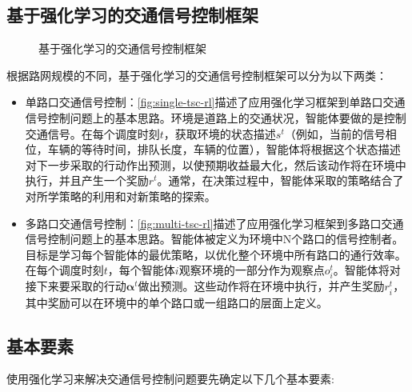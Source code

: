 \subsection{基于强化学习的交通信号控制框架}
\begin{figure}[t]
    \label{fig:TSC-RL}
    \quad
    \caption[]{基于强化学习的交通信号控制框架}
  \end{figure}
根据路网规模的不同，基于强化学习的交通信号控制框架可以分为以下两类：
\begin{itemize}
    \item 单路口交通信号控制：\autoref{fig:single-tsc-rl}描述了应用强化学习框架到单路口交通信号控制问题上的基本思路。环境是道路上的交通状况，智能体要做的是控制交通信号。在每个调度时刻$t$，获取环境的状态描述$s^t$（例如，当前的信号相位，车辆的等待时间，排队长度，车辆的位置），智能体将根据这个状态描述对下一步采取的行动作出预测，以使预期收益最大化，然后该动作将在环境中执行，并且产生一个奖励$r^t$。通常，在决策过程中，智能体采取的策略结合了对所学策略的利用和对新策略的探索。
    \item 多路口交通信号控制：\autoref{fig:multi-tsc-rl}描述了应用强化学习框架到多路口交通信号控制问题上的基本思路。智能体被定义为环境中N个路口的信号控制者。目标是学习每个智能体的最优策略，以优化整个环境中所有路口的通行效率。在每个调度时刻$t$，每个智能体$i$观察环境的一部分作为观察点$o_i^t$。智能体将对接下来要采取的行动$\mathbf{\alpha}^t$做出预测。这些动作将在环境中执行，并产生奖励$r_i^t$，其中奖励可以在环境中的单个路口或一组路口的层面上定义。
\end{itemize}
\subsection{基本要素}
使用强化学习来解决交通信号控制问题要先确定以下几个基本要素:

